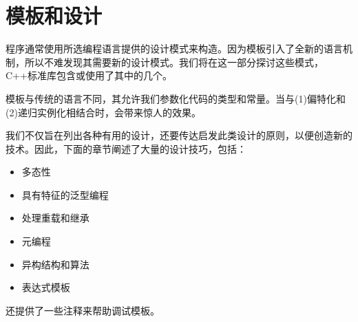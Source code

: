 \part{模板和设计}

程序通常使用所选编程语言提供的设计模式来构造。因为模板引入了全新的语言机制，所以不难发现其需要新的设计模式。我们将在这一部分探讨这些模式，C++标准库包含或使用了其中的几个。

模板与传统的语言不同，其允许我们参数化代码的类型和常量。当与(1)偏特化和(2)递归实例化相结合时，会带来惊人的效果。

我们不仅旨在列出各种有用的设计，还要传达启发此类设计的原则，以便创造新的技术。因此，下面的章节阐述了大量的设计技巧，包括：

\begin{itemize}
  \item 多态性
  \item 具有特征的泛型编程
  \item 处理重载和继承
  \item 元编程
  \item 异构结构和算法
  \item 表达式模板
\end{itemize}

还提供了一些注释来帮助调试模板。











